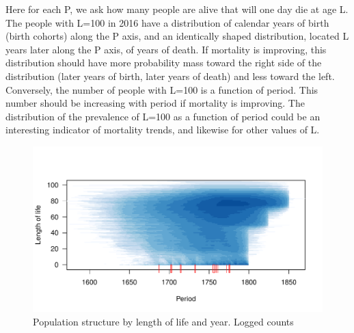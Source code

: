 \begin{small}
Here for each P, we ask how many people are alive that will one day die at age
L. The people with L=100 in 2016 have a distribution of calendar years
of birth (birth cohorts) along the P axis, and an identically shaped
distribution, located L years later along the P axis, of years of
death. If mortality is improving, this distribution should have more
probability mass toward the right side of the distribution (later
years of birth, later years of death) and less toward the left.
Conversely, the number of people with L=100 is a function of period.
This number should be increasing with period if mortality is
improving. The distribution of the prevalence of L=100 as a function
of period could be an interesting indicator of mortality trends, and
likewise for other values of L.
\end{small}

\begin{figure}
\centering
\includegraphics[scale=.9]{Figures/QuebecLP.pdf}
\caption{Population structure by length of life and year. Logged counts}
\label{fig:lpq}
\end{figure}

